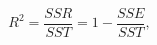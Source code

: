 \begin{equation}
R^2 = \frac {SSR}{SST} = 1 - \frac {SSE}{SST} ,
 \label{eq:rsquare}
\end{equation}
